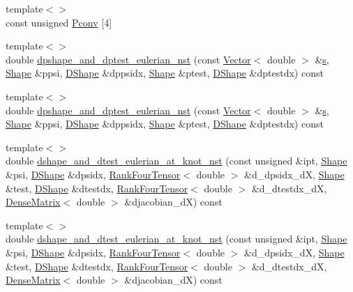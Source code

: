 \begin{DoxyCompactItemize}
\item 
{\footnotesize template$<$$>$ }\\const unsigned \hyperlink{classoomph_1_1GeneralisedNewtonianTTaylorHoodElement_a0458e47c21509174ad9647472e718f6b}{Pconv} \mbox{[}4\mbox{]}
\item 
{\footnotesize template$<$$>$ }\\double \hyperlink{classoomph_1_1GeneralisedNewtonianTTaylorHoodElement_a84173694a3d89aa02f6c7839871204b6}{dpshape\+\_\+and\+\_\+dptest\+\_\+eulerian\+\_\+nst} (const \hyperlink{classoomph_1_1Vector}{Vector}$<$ double $>$ \&\hyperlink{cfortran_8h_ab7123126e4885ef647dd9c6e3807a21c}{s}, \hyperlink{classoomph_1_1Shape}{Shape} \&ppsi, \hyperlink{classoomph_1_1DShape}{D\+Shape} \&dppsidx, \hyperlink{classoomph_1_1Shape}{Shape} \&ptest, \hyperlink{classoomph_1_1DShape}{D\+Shape} \&dptestdx) const
\item 
{\footnotesize template$<$$>$ }\\double \hyperlink{classoomph_1_1GeneralisedNewtonianTTaylorHoodElement_a18bf030630c7c0a90f62c809aa253684}{dpshape\+\_\+and\+\_\+dptest\+\_\+eulerian\+\_\+nst} (const \hyperlink{classoomph_1_1Vector}{Vector}$<$ double $>$ \&\hyperlink{cfortran_8h_ab7123126e4885ef647dd9c6e3807a21c}{s}, \hyperlink{classoomph_1_1Shape}{Shape} \&ppsi, \hyperlink{classoomph_1_1DShape}{D\+Shape} \&dppsidx, \hyperlink{classoomph_1_1Shape}{Shape} \&ptest, \hyperlink{classoomph_1_1DShape}{D\+Shape} \&dptestdx) const
\item 
{\footnotesize template$<$$>$ }\\double \hyperlink{classoomph_1_1GeneralisedNewtonianTTaylorHoodElement_afddd17add4a6c36248ed8fd68779a495}{dshape\+\_\+and\+\_\+dtest\+\_\+eulerian\+\_\+at\+\_\+knot\+\_\+nst} (const unsigned \&ipt, \hyperlink{classoomph_1_1Shape}{Shape} \&psi, \hyperlink{classoomph_1_1DShape}{D\+Shape} \&dpsidx, \hyperlink{classoomph_1_1RankFourTensor}{Rank\+Four\+Tensor}$<$ double $>$ \&d\+\_\+dpsidx\+\_\+dX, \hyperlink{classoomph_1_1Shape}{Shape} \&test, \hyperlink{classoomph_1_1DShape}{D\+Shape} \&dtestdx, \hyperlink{classoomph_1_1RankFourTensor}{Rank\+Four\+Tensor}$<$ double $>$ \&d\+\_\+dtestdx\+\_\+dX, \hyperlink{classoomph_1_1DenseMatrix}{Dense\+Matrix}$<$ double $>$ \&djacobian\+\_\+dX) const
\item 
{\footnotesize template$<$$>$ }\\double \hyperlink{classoomph_1_1GeneralisedNewtonianTTaylorHoodElement_aa2dea94c7df3e7ce8b187e00ad9222cd}{dshape\+\_\+and\+\_\+dtest\+\_\+eulerian\+\_\+at\+\_\+knot\+\_\+nst} (const unsigned \&ipt, \hyperlink{classoomph_1_1Shape}{Shape} \&psi, \hyperlink{classoomph_1_1DShape}{D\+Shape} \&dpsidx, \hyperlink{classoomph_1_1RankFourTensor}{Rank\+Four\+Tensor}$<$ double $>$ \&d\+\_\+dpsidx\+\_\+dX, \hyperlink{classoomph_1_1Shape}{Shape} \&test, \hyperlink{classoomph_1_1DShape}{D\+Shape} \&dtestdx, \hyperlink{classoomph_1_1RankFourTensor}{Rank\+Four\+Tensor}$<$ double $>$ \&d\+\_\+dtestdx\+\_\+dX, \hyperlink{classoomph_1_1DenseMatrix}{Dense\+Matrix}$<$ double $>$ \&djacobian\+\_\+dX) const
\end{DoxyCompactItemize}
